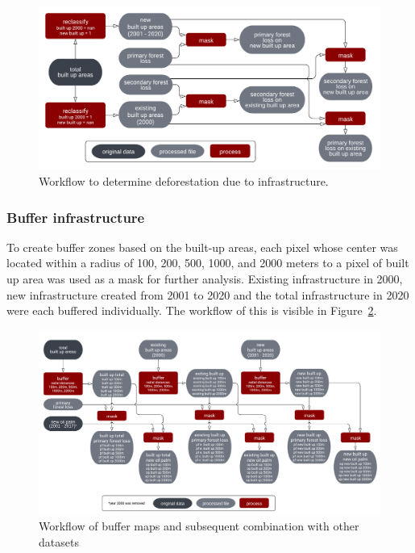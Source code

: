 \documentclass[
  letterpaper,
  DIV=11,
  numbers=noendperiod]{scrreprt}
\begin{document}
\begin{figure}[H]

{\centering \includegraphics{text/05_method_files/wf_infrastructure.png}

}

\caption{\label{fig-wf_infrastructure}Workflow to determine
deforestation due to infrastructure.}

\end{figure}

\hypertarget{buffer-infrastructure}{%
\subsubsection{Buffer infrastructure}\label{buffer-infrastructure}}

To create buffer zones based on the built-up areas, each pixel whose
center was located within a radius of 100, 200, 500, 1000, and 2000
meters to a pixel of built up area was used as a mask for further
analysis. Existing infrastructure in 2000, new infrastructure created
from 2001 to 2020 and the total infrastructure in 2020 were each
buffered individually. The workflow of this is visible in
Figure~\ref{fig-wf_buffer}.

\begin{figure}[H]

{\centering \includegraphics{text/05_method_files/wf_buffer.png}

}

\caption{\label{fig-wf_buffer}Workflow of buffer maps and subsequent
combination with other datasets}

\end{figure}
\end{document}
